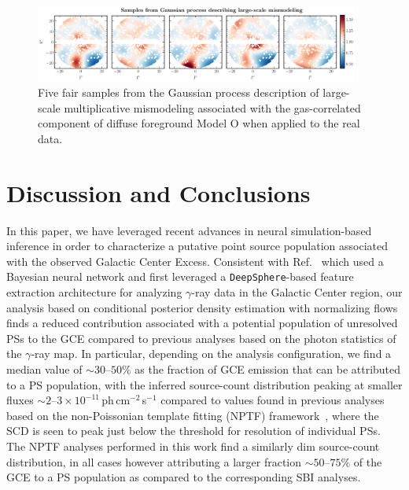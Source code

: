 \documentclass[prd,aps,10pt,nofootinbib,twocolumn,superscriptaddress,preprintnumbers,balancelastpage,longbibliography]{revtex4-1}
\begin{document}
%
\begin{figure}
    \centering
    \includegraphics[width=0.95\textwidth]{plots/dd_mismo_map.pdf}
    \caption{Five fair samples from the Gaussian process description of large-scale multiplicative mismodeling associated with the gas-correlated component of diffuse foreground Model O when applied to the real \Fermi data.}
    \label{fig:dd_mismo_map}
    \end{figure}

    

\section{Discussion and Conclusions}
\label{sec:conclusion}

In this paper, we have leveraged recent advances in neural simulation-based inference in order to characterize a putative point source population associated with the observed \Fermi Galactic Center Excess. Consistent with Ref.~\cite{List:2020mzd} which used a Bayesian neural network and first leveraged a \texttt{DeepSphere}-based feature extraction architecture for analyzing $\gamma$-ray data in the Galactic Center region, our analysis based on conditional posterior density estimation with normalizing flows finds a reduced contribution associated with a potential population of unresolved PSs to the GCE compared to previous analyses based on the photon statistics of the $\gamma$-ray map. In particular, depending on the analysis configuration, we find a median value of $\sim30$--$50\%$ as the fraction of GCE emission that can be attributed to a PS population, with the inferred source-count distribution peaking at smaller fluxes $\sim2$--$3\times 10^{-11}$\,ph\,cm$^{-2}$\,s$^{-1}$ compared to values found in previous analyses based on the non-Poissonian template fitting (NPTF) framework~\cite{Lee:2015fea}, where the SCD is seen to peak just below the threshold for resolution of individual PSs. The NPTF analyses performed in this work find a similarly dim source-count distribution, in all cases however attributing a larger fraction $\sim50$--$75\%$ of the GCE to a PS population as compared to the corresponding SBI analyses.
\end{document}
